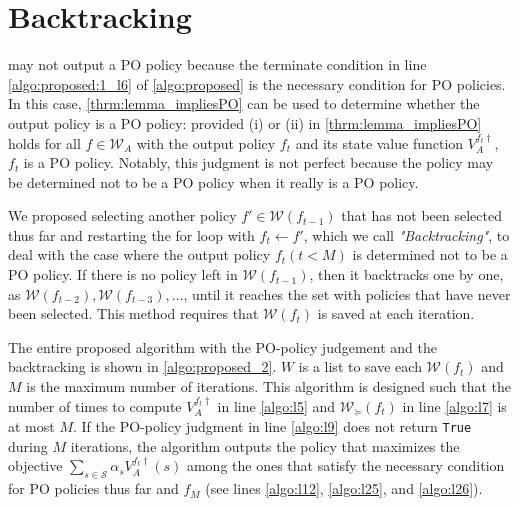 \documentclass{acml}
\begin{document}
\section{Backtracking}\label{apdx:proposed_2}

 may not output a PO policy because the terminate condition in line \ref{algo:proposed:1_l6} of \cref{algo:proposed} is the necessary condition for PO policies.
In this case, \cref{thrm:lemma_impliesPO} can be used to determine whether the output policy is a PO policy: provided (i) or (ii) in \cref{thrm:lemma_impliesPO} holds for all $f\in\mathcal{W}_A$ with the output policy $f_t$ and its state value function $V_A^{f_t\dag}$, $f_t$ is a PO policy.
Notably, this judgment is not perfect because the policy may be determined not to be a PO policy when it really is a PO policy. 

We proposed selecting another policy $f'\in\mathcal{W}(f_{t-1})$ that has not been selected thus far and restarting the for loop with $f_t\leftarrow f'$, which we call \textit{"Backtracking"}, to deal with the case where the output policy $f_t(t<M)$ is determined not to be a PO policy.
If there is no policy left in $\mathcal{W}(f_{t-1})$, then it backtracks one by one, as $\mathcal{W}(f_{t-2}), \mathcal{W}(f_{t-3}), \dots$, until it reaches the set with policies that have never been selected.
This method requires that $\mathcal{W}(f_t)$ is saved at each iteration.

The entire proposed algorithm with the PO-policy judgement and the backtracking is shown in \cref{algo:proposed_2}.
$W$ is a list to save each $\mathcal{W}(f_t)$ and $M$ is the maximum number of iterations.
This algorithm is designed such that the number of times to compute $V_A^{f_t\dag}$ in line \ref{algo:l5} and $\mathcal{W}_\succcurlyeq(f_t)$ in line \ref{algo:l7} is at most $M$.
If the PO-policy judgment in line \ref{algo:l9} does not return \texttt{True} during $M$ iterations, the algorithm outputs the policy that maximizes the objective $\sum_{s\in\mathcal{S}}\alpha_sV_A^{f_t\dag}(s)$ among the ones that satisfy the necessary condition for PO policies thus far and $f_M$ (see lines \ref{algo:l12}, \ref{algo:l25}, and \ref{algo:l26}).
\end{document}
